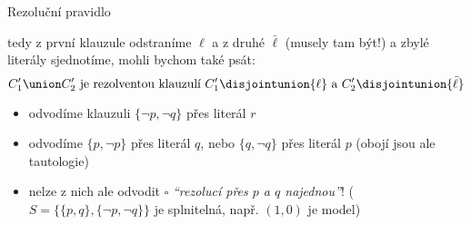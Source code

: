 \documentclass{beamer}
\begin{document}
\begin{frame}{Rezoluční pravidlo}    
    
    
    \pause
    tedy z první klauzule odstraníme $\ell$ a z druhé $\bar\ell$ (musely tam být!) a zbylé literály sjednotíme, mohli bychom také psát:\pause
    $$
    C_1'\union C_2'\text{ je rezolventou klauzulí }C_1'\disjointunion\{\ell\}\text{ a }C_2'\disjointunion\{\bar \ell\}
    $$
    \pause
    \vspace{-12pt}
    \begin{itemize}
        \item {}
        odvodíme klauzuli $\{\neg p,\neg q\}$ přes literál $r$\pause
        \item {}
        odvodíme $\{p,\neg p\}$ přes literál $q$, nebo $\{q,\neg q\}$ přes literál $p$ (obojí jsou ale tautologie)\pause
        
        \item nelze z nich ale odvodit $\square$ \emph{``rezolucí přes $p$ a $q$ najednou''}! ($S=\{\{p,q\},\{\neg p,\neg q\}\}$ je splnitelná, např. $(1,0)$ je model)
    \end{itemize}

\end{frame}
\end{document}
